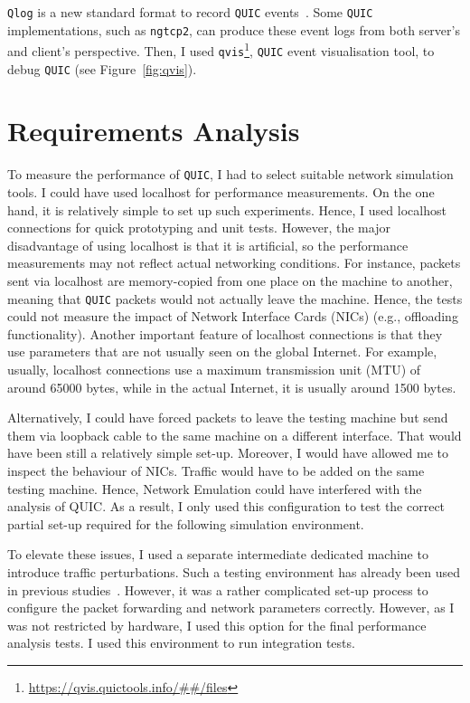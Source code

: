 \documentclass[12pt,a4paper]{report}
\begin{document}
\texttt{Qlog} is a new standard format to record \texttt{QUIC} events~\cite{draft-marx-qlog-event-definitions-quic-h3}.
Some \texttt{QUIC} implementations, such as \texttt{ngtcp2}, can produce these event logs from both server's and client's perspective.
Then, I used \texttt{qvis}\footnote{\url{https://qvis.quictools.info/##/files}}, \texttt{QUIC} event visualisation tool, to debug \texttt{QUIC} (see Figure~\ref{fig:qvis}).


    



\section{Requirements Analysis}

To measure the performance of \texttt{QUIC}, I had to select suitable network simulation tools.
I could have used localhost for performance measurements.
On the one hand, it is relatively simple to set up such experiments.
Hence, I used localhost connections for quick prototyping and unit tests.
However, the major disadvantage of using localhost is that it is artificial, so the performance measurements may not reflect actual networking conditions.
For instance, packets sent via localhost are memory-copied from one place on the machine to another, meaning that \texttt{QUIC} packets would not actually leave the machine.
Hence, the tests could not measure the impact of Network Interface Cards (NICs) (e.g., offloading functionality).
Another important feature of localhost connections is that they use parameters that are not usually seen on the global Internet.
For example, usually, localhost connections use a maximum transmission unit (MTU) of around 65000 bytes, while in the actual Internet, it is usually around 1500 bytes.

 Alternatively, I could have forced packets to leave the testing machine but send them via loopback cable to the same machine on a different interface. 
 That would have been still a relatively simple set-up. 
 Moreover, I would have allowed me to inspect the behaviour of NICs.
 Traffic would have to be added on the same testing machine.
 Hence, Network Emulation could have interfered with the analysis of QUIC.
 As a result, I only used this configuration to test the correct partial set-up required for the following simulation environment.
 
 To elevate these issues, I used a separate intermediate dedicated machine to introduce traffic perturbations.
 Such a testing environment has already been used in previous studies~\cite{Making_QUIC_Quicker}.
 However, it was a rather complicated set-up process to configure the packet forwarding and network parameters correctly.
 However, as I was not restricted by hardware, I used this option for the final performance analysis tests.
 I used this environment to run integration tests.
 
\end{document}
